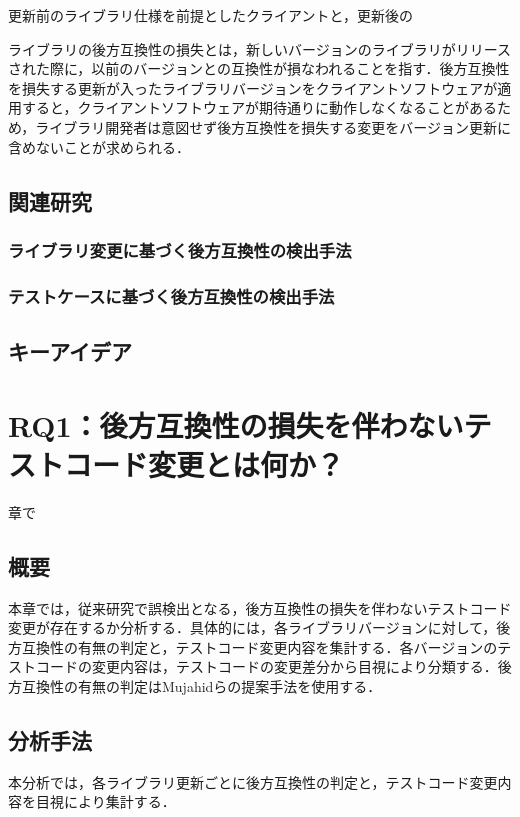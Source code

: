 \documentclass[11pt,dvipdfmx]{jreport}
\begin{document}
更新前のライブラリ仕様を前提としたクライアントと，更新後の


ライブラリの後方互換性の損失とは，新しいバージョンのライブラリがリリースされた際に，以前のバージョンとの互換性が損なわれることを指す．後方互換性を損失する更新が入ったライブラリバージョンをクライアントソフトウェアが適用すると，クライアントソフトウェアが期待通りに動作しなくなることがあるため，ライブラリ開発者は意図せず後方互換性を損失する変更をバージョン更新に含めないことが求められる．

\section{関連研究}

\subsection{ライブラリ変更に基づく後方互換性の検出手法}

\subsection{テストケースに基づく後方互換性の検出手法}

\section{キーアイデア}

\chapter{RQ1：後方互換性の損失を伴わないテストコード変更とは何か？}\label{chap:rq1}章で

\section{概要}
本章では，従来研究で誤検出となる，後方互換性の損失を伴わないテストコード変更が存在するか分析する．具体的には，各ライブラリバージョンに対して，後方互換性の有無の判定と，テストコード変更内容を集計する．各バージョンのテストコードの変更内容は，テストコードの変更差分から目視により分類する．後方互換性の有無の判定はMujahidらの提案手法を使用する．

\section{分析手法}
本分析では，各ライブラリ更新ごとに後方互換性の判定と，テストコード変更内容を目視により集計する．
\end{document}
